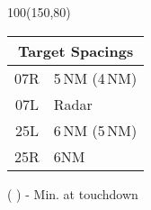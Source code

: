 \documentclass[10pt,landscape,a4paper]{article}
\begin{document}
\begin{textblock}{100}(150,80)
  \begin{table}[]
    \begin{tabular}{|c|l|}
      \multicolumn{2}{c}{\textbf{Target Spacings}} \\ \hline
      07R & 5\,NM (4\,NM)                          \\ \hline
      07L & Radar                                  \\ \hline
      25L & 6\,NM (5\,NM)                          \\ \hline
      25R & 6NM                                    \\ \hline
    \end{tabular}
  \end{table}
  ( ) - Min. at touchdown
\end{textblock}
\end{document}
